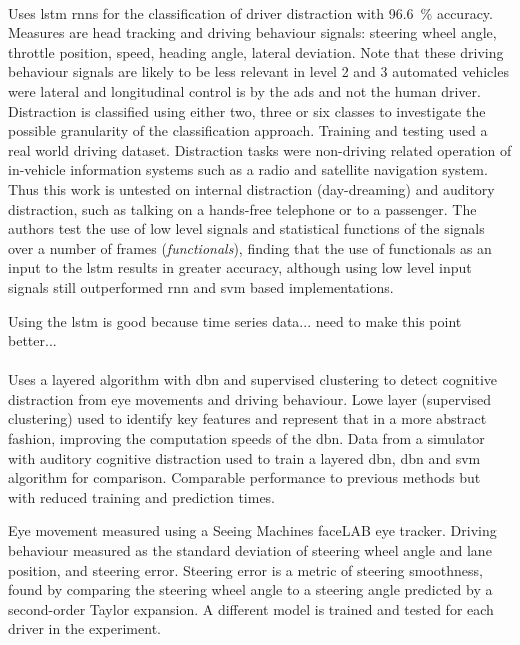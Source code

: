 \documentclass[11pt, parskip=half*,twoside=false]{scrbook}
\begin{document}
\paragraph{\citet{wollmerOnlineDriverDistraction2011}} Uses \gls{lstm} \glspl{rnn} for the classification of driver distraction with 96.6~\% accuracy. Measures are head tracking and driving behaviour signals: steering wheel angle, throttle position, speed, heading angle, lateral deviation. Note that these driving behaviour signals are likely to be less relevant in level 2 and 3 automated vehicles were lateral and longitudinal control is by the \gls{ads} and not the human driver. Distraction is classified using either two, three or six classes to investigate the possible granularity of the classification approach. Training and testing used a real world driving dataset. Distraction tasks were non-driving related operation of in-vehicle information systems such as a radio and satellite navigation system. Thus this work is untested on internal distraction (day-dreaming) and auditory distraction, such as talking on a hands-free telephone or to a passenger. The authors test the use of low level signals and statistical functions of the signals over a number of frames (\emph{functionals}), finding that the use of functionals as an input to the \gls{lstm} results in greater accuracy, although using low level input signals still outperformed \gls{rnn} and \gls{svm} based implementations.

Using the \gls{lstm} is good because time series data... need to make this point better...

\paragraph{\citet{liangHybridBayesianNetwork2014}} Uses a layered algorithm with \gls{dbn} and supervised clustering to detect cognitive distraction from eye movements and driving behaviour. Lowe layer (supervised clustering) used to identify key features and represent that in a more abstract fashion, improving the computation speeds of the \gls{dbn}.  Data from a simulator with auditory cognitive distraction used to train a layered \gls{dbn}, \gls{dbn} and \gls{svm} algorithm for comparison. Comparable performance to previous methods but with reduced training and prediction times. 

Eye movement measured using a Seeing Machines faceLAB eye tracker. Driving behaviour measured as the standard deviation of steering wheel angle and lane position, and steering error. Steering error is a metric of steering smoothness, found by comparing the steering wheel angle to a steering angle predicted by a second-order Taylor expansion. A different model is trained and tested for each driver in the experiment.
\end{document}
